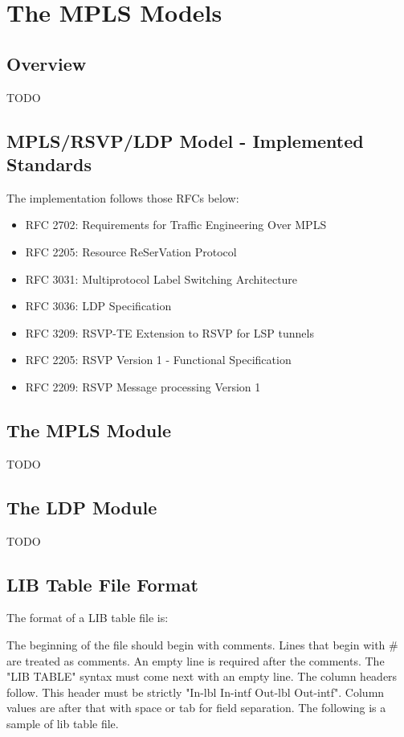 \ifdraft

\chapter{The MPLS Models}
\label{cha:mpls}


\section{Overview}

TODO


\section{MPLS/RSVP/LDP Model - Implemented Standards}

The implementation follows those RFCs below:

\begin{itemize}
  \item RFC 2702: Requirements for Traffic Engineering Over MPLS
  \item RFC 2205: Resource ReSerVation Protocol
  \item RFC 3031: Multiprotocol Label Switching Architecture
  \item RFC 3036: LDP Specification
  \item RFC 3209: RSVP-TE Extension to RSVP for LSP tunnels
  \item RFC 2205: RSVP Version 1 - Functional Specification
  \item RFC 2209: RSVP Message processing Version 1
\end{itemize}

\section{The MPLS Module}

TODO

\section{The LDP Module}

TODO

\section{LIB Table File Format}

The format of a LIB table file is:

The beginning of the file should begin with comments. Lines that begin with \# are treated
as comments. An empty line is required after the comments. The "LIB TABLE"
syntax must come next with an empty line. The column headers follow. This header
must be strictly "In-lbl In-intf Out-lbl Out-intf". Column
values are after that with space or tab for field separation.
The following is a sample of lib table file.

